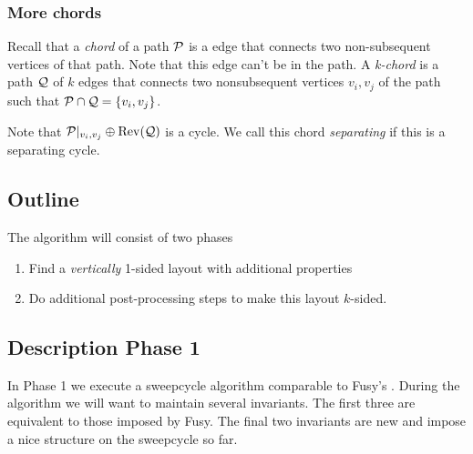 
  \subsubsection{More chords}
    Recall that a \emph{chord} of a path $\P$ is a edge that connects two non-subsequent vertices of that path. Note that this edge can't be in the path. A \emph{k-chord} is a path $\Q$ of $k$ edges that connects two nonsubsequent vertices $v_i, v_j$ of the path such that $\P \cap \Q = \braces{v_i, v_j}$.

    Note that $\P|_{v_i, v_j} \oplus \rev(\Q)$ is a cycle. We call this chord \emph{separating} if this is a separating cycle. 


\subsection{Outline}
  The algorithm will consist of two phases

  \begin{enumerate}
    \item Find a \emph{vertically} 1-sided layout with additional properties
    \item Do additional post-processing steps to make this layout $k$-sided.
  \end{enumerate}

\subsection{Description Phase 1}
  In Phase 1 we execute a sweepcycle algorithm comparable to Fusy's \cite{Fusy2006}.
  During the algorithm we will want to maintain several invariants. The first three are equivalent to those imposed by Fusy. The final two invariants are new and impose a nice structure on the sweepcycle so far.

